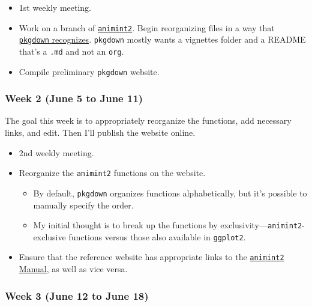 \documentclass[
]{article}
\providecommand{\tightlist}{%
  \setlength{\itemsep}{0pt}\setlength{\parskip}{0pt}}\usepackage{longtable,booktabs,array}
\begin{document}
\begin{itemize}
\tightlist
\item
  1st weekly meeting.
\item
  Work on a branch of
  \href{https://github.com/tdhock/animint2}{\texttt{animint2}}. Begin
  reorganizing files in a way that
  \href{https://pkgdown.r-lib.org/articles/pkgdown.html}{\texttt{pkgdown}
  recognizes}. \texttt{pkgdown} mostly wants a vignettes folder and a
  README that's a \texttt{.md} and not an \texttt{org}.
\item
  Compile preliminary \texttt{pkgdown} website.
\end{itemize}

\hypertarget{week-2-june-5-to-june-11}{%
\subsubsection{Week 2 (June 5 to June
11)}\label{week-2-june-5-to-june-11}}

The goal this week is to appropriately reorganize the functions, add
necessary links, and edit. Then I'll publish the website online.

\begin{itemize}
\item
  2nd weekly meeting.
\item
  Reorganize the \texttt{animint2} functions on the website.

  \begin{itemize}
  \tightlist
  \item
    By default, \texttt{pkgdown} organizes functions alphabetically, but
    it's possible to manually specify the order.
  \item
    My initial thought is to break up the functions by
    exclusivity---\texttt{animint2}-exclusive functions versus those
    also available in \texttt{ggplot2}.
  \end{itemize}
\item
  Ensure that the reference website has appropriate links to the
  \href{https://rcdata.nau.edu/genomic-ml/animint2-manual/Ch00-preface.html}{\texttt{animint2}
  Manual}, as well as vice versa.
\end{itemize}

\hypertarget{week-3-june-12-to-june-18}{%
\subsubsection{Week 3 (June 12 to June
18)}\label{week-3-june-12-to-june-18}}
\end{document}
